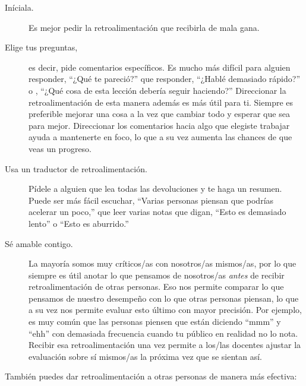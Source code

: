 \begin{description}

\item[Iníciala.]
  Es mejor pedir la retroalimentación que recibirla de mala gana.

\item[Elige tus preguntas,]
  es decir, pide comentarios específicos.
  Es mucho más difícil para alguien responder,
  ``¿Qué te pareció?''
  que responder,
  ``¿Hablé demasiado rápido?''
  o ,
  ``¿Qué cosa de esta lección debería seguir haciendo?''
  Direccionar la retroalimentación de esta manera además es más útil para ti.
  Siempre es preferible mejorar una cosa a la vez
  que cambiar todo y esperar que sea para mejor.
  Direccionar los comentarios hacia algo que elegiste trabajar ayuda a mantenerte en foco,
  lo que a su vez aumenta las chances de que veas un progreso.

\item[Usa un traductor de retroalimentación.]
  Pídele a alguien que lea todas las devoluciones y te haga un resumen.
  Puede ser más fácil escuchar,
  ``Varias personas piensan que podrías acelerar un poco,''
  que leer varias notas que digan, ``Esto es demasiado lento''
  o ``Esto es aburrido.''

\item[Sé amable contigo.]
  La mayoría somos muy críticos/as con nosotros/as mismos/as,
  por lo que siempre es útil anotar lo que pensamos de nosotros/as
  \emph{antes} de recibir retroalimentación de otras personas.
  Eso nos permite comparar lo que pensamos de nuestro desempeño
  con lo que otras personas piensan,
  lo que a su vez nos permite evaluar esto último con mayor precisión.
  Por ejemplo,
  es muy común que las personas piensen que están diciendo ``mmm'' y ``ehh'' con demasiada frecuencia
  cuando tu público en realidad no lo nota.
  Recibir esa retroalimentación una vez permite a los/las docentes ajustar la evaluación sobre sí mismos/as la próxima vez que se sientan así.

\end{description}

\noindent
También puedes dar retroalimentación a otras personas de manera más efectiva:

